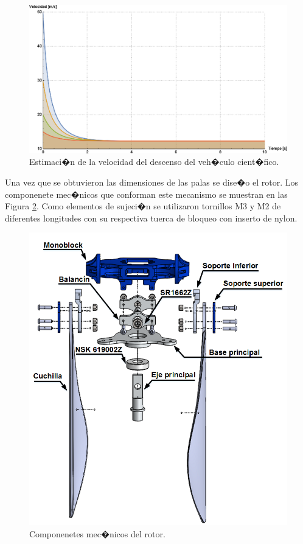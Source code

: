 \documentclass[10pt,a4paper]{book}
\begin{document}
\begin{figure}[H]
\begin{center}
\includegraphics[scale=0.90]{Imagenes/Grafica2.eps}  
\caption{Estimaci�n de la velocidad del descenso del veh�culo cient�fico. \label{fig:Grafica2}}
\end{center}
\end{figure}

Una vez que se obtuvieron las dimensiones de las palas se dise�o el rotor. Los componenete mec�nicos que conforman este mecanismo se muestran en las Figura \ref{img:Partesrotor}. Como elementos de sujeci�n se utilizaron tornillos M3 y M2 de diferentes longitudes con su respectiva tuerca de bloqueo con inserto de nylon.

\begin{figure}[H]
\begin{center}
\includegraphics[scale=0.42]{Imagenes/Partesrotor.png}  
\caption{Componenetes mec�nicos del rotor. \label{img:Partesrotor}}
\end{center}
\end{figure}
\end{document}
